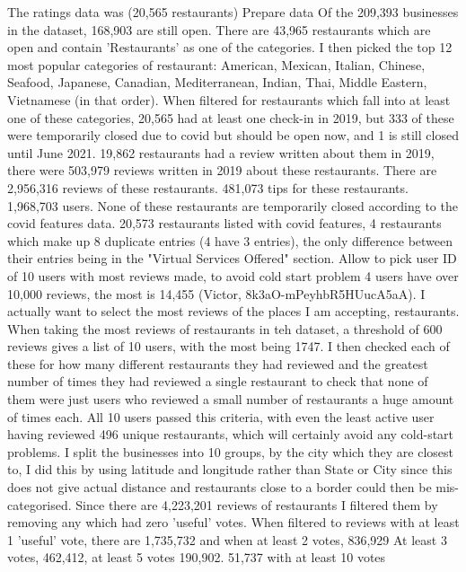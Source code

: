 \documentclass[conference]{IEEEtran}
\begin{document}
The ratings data was 
(20,565 restaurants)
Prepare data
Of the 209,393 businesses in the dataset, 168,903 are still open. 
There are 43,965 restaurants which are open and contain 'Restaurants' as one of the categories. 
I then picked the top 12 most popular categories of restaurant: American, Mexican, Italian, Chinese, 
Seafood, Japanese, Canadian, Mediterranean, Indian, Thai, Middle Eastern, Vietnamese (in that order). 
When filtered for restaurants which fall into at least one of these categories, 
20,565 had at least one check-in in 2019, but 333 of these were temporarily closed due to covid but should be 
open now, and 1 is still closed until June 2021. 
19,862 restaurants had a review written about them in 2019, there were 503,979 reviews written in 2019 about these restaurants. 
There are 2,956,316 reviews of these restaurants. 
481,073 tips for these restaurants. 
1,968,703 users. 
None of these restaurants are temporarily closed according to the covid features data. 
20,573 restaurants listed with covid features, 4 restaurants which make up 8 duplicate entries 
(4 have 3 entries), the only difference between their entries being in the 
"Virtual Services Offered" section. 
Allow to pick user ID of 10 users with most reviews made, to avoid cold start problem
4 users have over 10,000 reviews, the most is 14,455 (Victor, 8k3aO-mPeyhbR5HUucA5aA). 
I actually want to select the most reviews of the places I am accepting, restaurants. 
When taking the most reviews of restaurants in teh dataset, a threshold of 600 reviews gives a list of 10 users, 
with the most being 1747. 
I then checked each of these for how many different restaurants they had reviewed and the greatest number of times 
they had reviewed a single restaurant to check that none of them were just users who reviewed a small number of 
restaurants a huge amount of times each. 
All 10 users passed this criteria, with even the least active user having reviewed 496 unique restaurants, which will 
certainly avoid any cold-start problems. 
I split the businesses into 10 groups, by the city which they are closest to, I did this by using latitude and 
longitude rather than State or City since this does not give actual distance and restaurants close to a border 
could then be mis-categorised. 
Since there are 4,223,201 reviews of restaurants I filtered them by removing any which had zero 'useful' votes. 
When filtered to reviews with at least 1 'useful' vote, there are 1,735,732 and when at least 2 votes, 836,929
At least 3 votes, 462,412, at least 5 votes 190,902. 
51,737 with at least 10 votes
\end{document}
